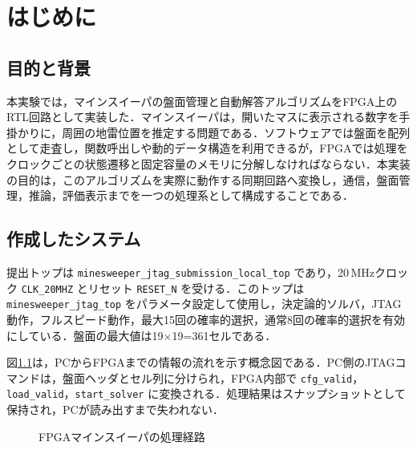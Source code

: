 \chapter{はじめに}
\label{ch:introduction}

\section{目的と背景}
本実験では，マインスイーパの盤面管理と自動解答アルゴリズムをFPGA上のRTL回路として実装した．マインスイーパは，開いたマスに表示される数字を手掛かりに，周囲の地雷位置を推定する問題である．ソフトウェアでは盤面を配列として走査し，関数呼出しや動的データ構造を利用できるが，FPGAでは処理をクロックごとの状態遷移と固定容量のメモリに分解しなければならない．本実装の目的は，このアルゴリズムを実際に動作する同期回路へ変換し，通信，盤面管理，推論，評価表示までを一つの処理系として構成することである．

\section{作成したシステム}
提出トップは \texttt{minesweeper\_jtag\_submission\_local\_top} であり，20\,MHzクロック \texttt{CLK\_20MHZ} とリセット \texttt{RESET\_N} を受ける．このトップは \texttt{minesweeper\_jtag\_top} をパラメータ設定して使用し，決定論的ソルバ，JTAG動作，フルスピード動作，最大15回の確率的選択，通常8回の確率的選択を有効にしている．盤面の最大値は19\(\times\)19=361セルである．

図\ref{fig:system-overview-intro}は，PCからFPGAまでの情報の流れを示す概念図である．PC側のJTAGコマンドは，盤面ヘッダとセル列に分けられ，FPGA内部で \texttt{cfg\_valid}，\texttt{load\_valid}，\texttt{start\_solver} に変換される．処理結果はスナップショットとして保持され，PCが読み出すまで失われない．

\begin{figure}[tb]
  \centering
  \caption{FPGAマインスイーパの処理経路}
  \label{fig:system-overview-intro}
\end{figure}

